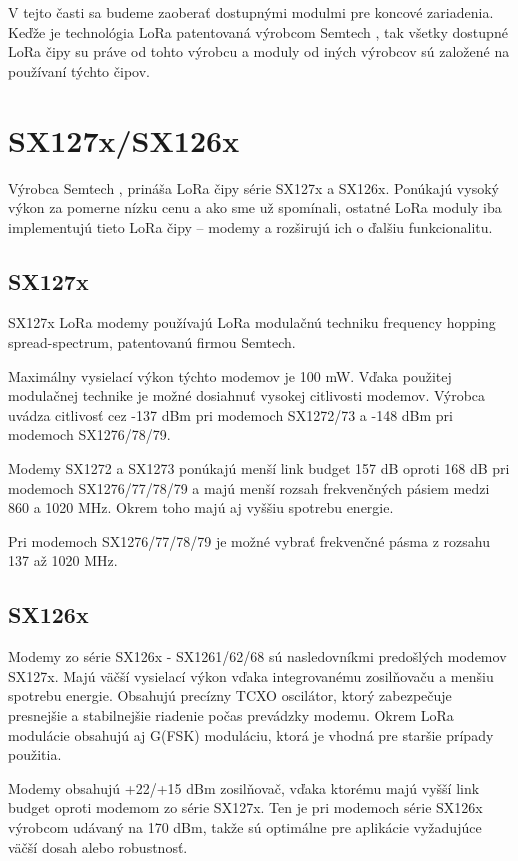 \documentclass[slovak,master]{diploma}
\begin{document}
V tejto časti sa budeme zaoberať dostupnými modulmi pre koncové zariadenia.
Keďže je technológia LoRa patentovaná výrobcom Semtech \cite{semtech}, tak všetky dostupné LoRa čipy su práve od tohto výrobcu a moduly od iných výrobcov 
sú založené na používaní týchto čipov.

\section{SX127x/SX126x}
Výrobca Semtech \cite{semtech}, prináša LoRa čipy série SX127x a SX126x. Ponúkajú vysoký výkon za pomerne nízku cenu a ako sme už spomínali, ostatné LoRa moduly 
iba implementujú tieto LoRa čipy -- modemy a rozširujú ich o ďalšiu funkcionalitu.

\subsection{SX127x}
SX127x LoRa modemy používajú LoRa modulačnú techniku frequency hopping spread-spectrum, patentovanú firmou Semtech.

Maximálny vysielací výkon týchto modemov je 100 mW.
Vďaka použitej modulačnej technike je možné dosiahnuť vysokej citlivosti modemov.
Výrobca uvádza citlivosť cez -137 dBm pri modemoch SX1272/73 a -148 dBm pri modemoch SX1276/78/79.

Modemy SX1272 a SX1273 ponúkajú menší link budget 157 dB oproti 168 dB pri modemoch SX1276/77/78/79 a majú menší rozsah frekvenčných pásiem medzi 860 a 1020 MHz.
Okrem toho majú aj vyššiu spotrebu energie.

Pri modemoch SX1276/77/78/79 je možné vybrať frekvenčné pásma z rozsahu 137 až 1020 MHz.

\subsection{SX126x}

Modemy zo série SX126x - SX1261/62/68 sú nasledovníkmi predošlých modemov SX127x. Majú väčší vysielací výkon vďaka integrovanému zosilňovaču a menšiu spotrebu energie. 
Obsahujú precízny TCXO oscilátor, ktorý zabezpečuje presnejšie a stabilnejšie riadenie počas prevádzky modemu. Okrem LoRa modulácie obsahujú aj G(FSK) moduláciu, ktorá je vhodná pre staršie 
prípady použitia.

Modemy obsahujú +22/+15 dBm zosilňovač, vďaka ktorému majú vyšší link budget oproti modemom zo série SX127x. 
Ten je pri modemoch série SX126x výrobcom udávaný na 170 dBm, takže sú optimálne pre aplikácie vyžadujúce väčší dosah alebo robustnosť.
\end{document}
